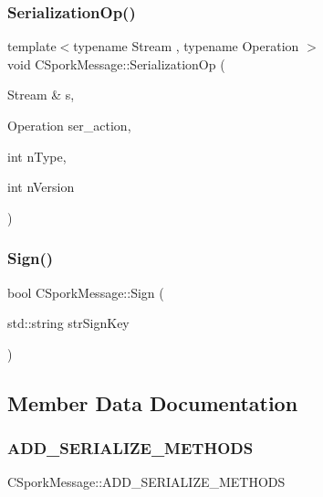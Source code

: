 \subsubsection{\texorpdfstring{Serialization\+Op()}{SerializationOp()}}
{\footnotesize\ttfamily template$<$typename Stream , typename Operation $>$ \\
void C\+Spork\+Message\+::\+Serialization\+Op (\begin{DoxyParamCaption}\item[{Stream \&}]{s,  }\item[{Operation}]{ser\+\_\+action,  }\item[{int}]{n\+Type,  }\item[{int}]{n\+Version }\end{DoxyParamCaption})\hspace{0.3cm}{\ttfamily [inline]}}

\mbox{\label{class_c_spork_message_aa41c57e7ac23f5687be8d1679081f1d7}} 
\subsubsection{\texorpdfstring{Sign()}{Sign()}}
{\footnotesize\ttfamily bool C\+Spork\+Message\+::\+Sign (\begin{DoxyParamCaption}\item[{std\+::string}]{str\+Sign\+Key }\end{DoxyParamCaption})}



\subsection{Member Data Documentation}
\mbox{\label{class_c_spork_message_afcbd5a0f8bdeebe3794088bf29136071}} 
\subsubsection{\texorpdfstring{A\+D\+D\+\_\+\+S\+E\+R\+I\+A\+L\+I\+Z\+E\+\_\+\+M\+E\+T\+H\+O\+DS}{ADD\_SERIALIZE\_METHODS}}
{\footnotesize\ttfamily C\+Spork\+Message\+::\+A\+D\+D\+\_\+\+S\+E\+R\+I\+A\+L\+I\+Z\+E\+\_\+\+M\+E\+T\+H\+O\+DS}

